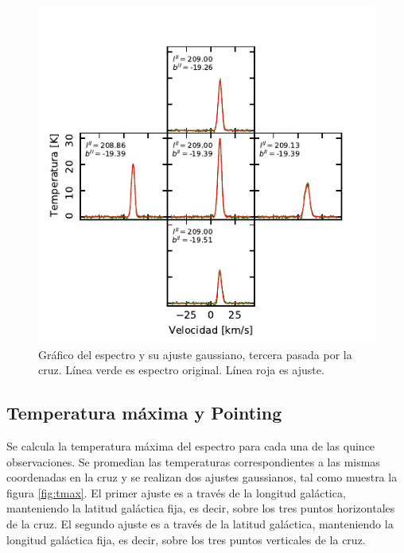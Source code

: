 \begin{figure}[htbp]
	\centering
	\includegraphics{specfit3.pdf}
	\caption{Gráfico del espectro y su ajuste gaussiano, tercera pasada por la cruz. Línea verde es espectro original. Línea roja es ajuste.}
	\label{fig:specfit3}
\end{figure}

\subsection{Temperatura máxima y Pointing}

Se calcula la temperatura máxima del espectro para cada una de las quince observaciones. Se promedian las temperaturas correspondientes a las mismas coordenadas en la cruz y se realizan dos ajustes gaussianos, tal como muestra la figura \ref{fig:tmax}. El primer ajuste es a través de la longitud galáctica, manteniendo la latitud galáctica fija, es decir, sobre los tres puntos horizontales de la cruz. El segundo ajuste es a través de la latitud galáctica, manteniendo la longitud galáctica fija, es decir, sobre los tres puntos verticales de la cruz.

